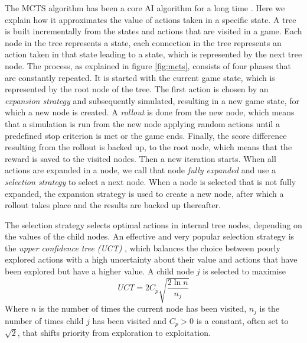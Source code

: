 \label{subsec:mcts}
The MCTS algorithm has been a core AI algorithm for a long time
\cite{browne2012survey}. Here we explain how it approximates the value
of actions taken in a specific state. A tree is built incrementally from
the states and actions that are visited in a game. Each node in the tree
represents a state, each connection in the tree represents an action taken in
that state leading to a state, which is represented by the next tree node. 
The process, as explained in figure \ref{fig:mcts}, consists of four phases that
are constantly repeated. It is started with the current game state, which is
represented by the root node of the tree. The first action is chosen by an
\emph{expansion strategy} and subsequently simulated, resulting in a new game
state, for which a new node is created. A \emph{rollout} is done from the new
node, which means that a simulation is run from the new node applying random
actions until a predefined stop criterion is met or the game ends. Finally, the
score difference resulting from the rollout is backed up, to the root node,
which means that the reward is saved to the visited nodes. Then a new iteration
starts. When all actions are expanded in a node, we call that node \emph{fully
expanded} and use a \emph{selection strategy} to select a next node. When a node
is selected that is not fully expanded, the expansion strategy is used to create
a new node, after which a rollout takes place and the results are backed up
thereafter.

The selection strategy selects optimal actions in internal tree nodes, depending
on the values of the child nodes. An effective and very popular selection
strategy is the \emph{upper confidence tree (UCT)} \cite{kocsis2006bandit},
which balances the choice between poorly explored actions with a high
uncertainty about their value and actions that have been explored but have a
higher value. A child node $j$ is selected to maximise
\begin{equation}
	\label{eq:uct}
	UCT = 2C_p \sqrt{\frac{2 \ln n}{n_j}}
\end{equation}
Where $n$ is the number of times the current node has been visited, $n_j$ is the
number of times child $j$ has been visited and $C_p > 0$ is a constant, often
set to $\sqrt{2}$, that shifts priority from exploration to exploitation.

